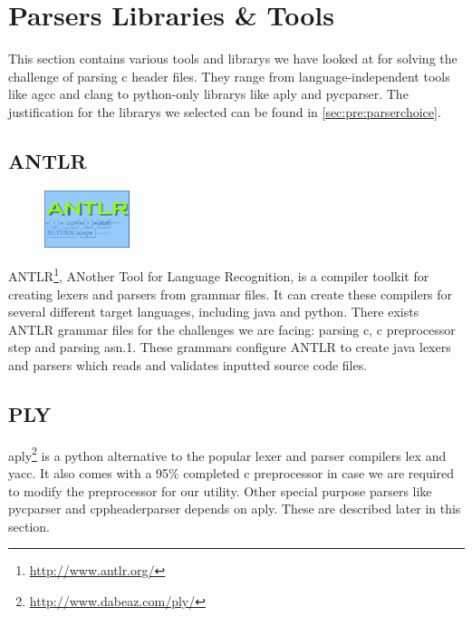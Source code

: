 \section{Parsers Libraries \& Tools}
\label{sec:pre:parser}
This section contains various tools and \glspl{library} we have looked at for solving
the challenge of parsing \Gls{c} \gls{header} files. They range from language-independent
tools like \gls{agcc} and \Gls{clang} to \Gls{python}-only \glspl{library} like \Gls{aply} and \gls{pycparser}. The
justification for the \glspl{library} we selected can be found in
\autoref{sec:pre:parserchoice}.

\subsection{ANTLR}
\label{sec:pre:antlr}
\begin{figure}
	\vspace{-20pt}
	\includegraphics[width=2.5cm]{./planning/img/antlr_logo}
	\vspace{-20pt}
\end{figure}
ANTLR\footnote{\url{http://www.antlr.org/}}, ANother Tool for Language
Recognition, is a compiler toolkit for creating \glspl{lexer} and \glspl{parser} from grammar
files. It can create these compilers for several different target languages,
including \Gls{java} and \Gls{python}. There exists ANTLR grammar files for the challenges
we are facing: parsing \Gls{c}, \Gls{c} \gls{preprocessor} step and parsing \Gls{asn.1}. These grammars
configure ANTLR to create \Gls{java} \glspl{lexer} and \glspl{parser} which reads and validates
inputted source code files.

\subsection{PLY}
\Gls{aply}\footnote{\url{http://www.dabeaz.com/ply/}} is a \Gls{python} alternative to the
popular \gls{lexer} and \gls{parser} compilers lex and yacc. It also comes with a 95\%
completed \Gls{c} \gls{preprocessor} in case we are required to modify the \gls{preprocessor}
for our \gls{utility}. Other special purpose \glspl{parser} like \gls{pycparser} and
cppheaderparser depends on \Gls{aply}. These are described later in this section.

